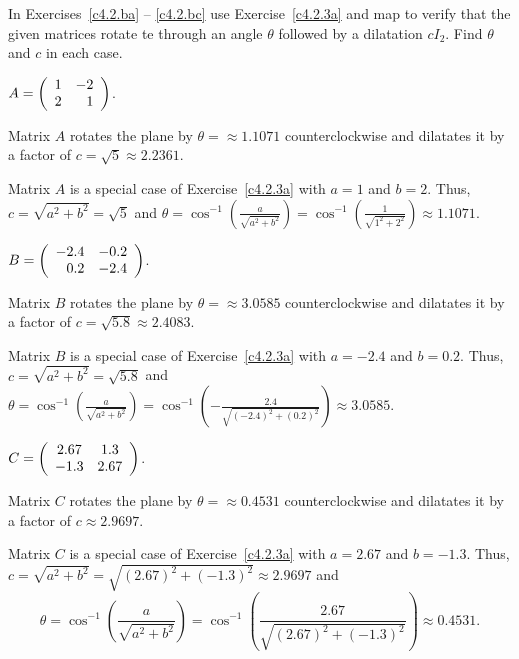\documentclass{ximera}
\begin{document}
\noindent In Exercises~\ref{c4.2.ba} -- \ref{c4.2.bc} use
Exercise~\ref{c4.2.3a} and {\sf map} to verify that the given matrices
rotate te through an angle $\theta$ followed by a dilatation $cI_2$.
Find $\theta$ and $c$ in each case.
\begin{computerExercise}  \label{c4.2.ba}
$A=\left(\begin{array}{rr} 1 & -2\\ 2 &1\end{array}\right)$.

\begin{solution}
\ans Matrix $A$ rotates the plane by $\theta =
\approx 1.1071$ counterclockwise and dilatates it by a factor of
$c = \sqrt{5} \approx 2.2361$.

\soln Matrix $A$ is a special case of Exercise~\ref{c4.2.3a} with $a = 1$
and $b = 2$.  Thus, $c = \sqrt{a^2 + b^2} = \sqrt{5}$ and
$\theta = \cos^{-1}\left(\frac{a}{\sqrt{a^2 + b^2}}\right) =
\cos^{-1}\left(\frac{1}{\sqrt{1^2 + 2^2}}\right) \approx 1.1071$.

\end{solution}
\end{computerExercise}
\begin{computerExercise}  \label{c4.2.bb}
$B=\left(\begin{array}{rr} -2.4 & -0.2\\ 0.2 &-2.4\end{array}\right)$.

\begin{solution}
\ans Matrix $B$ rotates the plane by $\theta =
\approx 3.0585$ counterclockwise and dilatates it by a factor of
$c = \sqrt{5.8} \approx 2.4083$.

\soln Matrix $B$ is a special case of Exercise~\ref{c4.2.3a} with $a = -2.4$
and $b = 0.2$.  Thus, $c = \sqrt{a^2 + b^2} = \sqrt{5.8}$ and
$\theta = \cos^{-1}\left(\frac{a}{\sqrt{a^2 + b^2}}\right) =
\cos^{-1}\left(-\frac{2.4}{\sqrt{(-2.4)^2 + (0.2)^2}}\right) \approx 3.0585$.

\end{solution}
\end{computerExercise}
\begin{computerExercise}  \label{c4.2.bc}
$C=\left(\begin{array}{cc} 2.67 & 1.3\\ -1.3 &2.67\end{array}\right)$.

\begin{solution}
\ans Matrix $C$ rotates the plane by $\theta =
\approx 0.4531$ counterclockwise and dilatates it by a factor of
$c \approx 2.9697$.

\soln Matrix $C$ is a special case of Exercise~\ref{c4.2.3a} with $a = 2.67$
and $b = -1.3$.  Thus, $c = \sqrt{a^2 + b^2} = \sqrt{(2.67)^2 + (-1.3)^2}
\approx 2.9697$ and
\[
\theta = \cos^{-1}\left(\frac{a}{\sqrt{a^2 + b^2}}
\right) = \cos^{-1}\left(\frac{2.67}{\sqrt{(2.67)^2 + (-1.3)^2}}\right)
\approx 0.4531.
\]

\end{solution}
\end{computerExercise}
\end{document}

